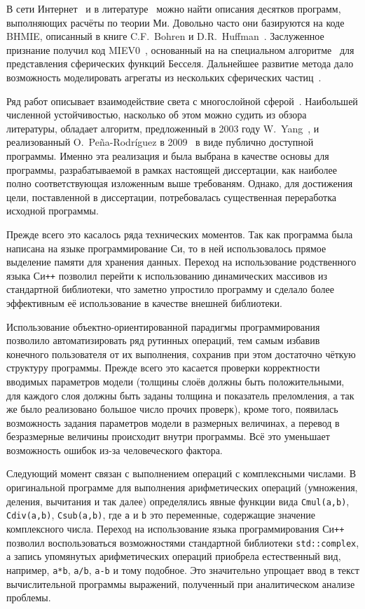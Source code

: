 В сети Интернет~\cite{scattport,wiki-mie-codes} и в
литературе~\cite{Wriedt-2009} можно найти описания десятков программ,
выполняющих расчёты по теории Ми.  Довольно часто они базируются на
коде BHMIE, описанный в книге C.F.~Bohren и
D.R.~Huffman~\cite{Bohren-1983}.  Заслуженное признание получил код
MIEV0~\cite{Wiscombe-1980}, основанный на на специальном
алгоритме~\cite{Lentz-76} для представления сферических функций
Бесселя. Дальнейшее развитие метода дало возможность моделировать
агрегаты из нескольких сферических частиц~\cite{Mackowski-96,Xu-95}.

Ряд работ описывает взаимодействие света с многослойной
сферой~\cite{Kai-94,Wu-97, Bhandari-85}.  Наибольшей численной
устойчивостью, насколько об этом можно судить из обзора литературы,
обладает алгоритм, предложенный в 2003 году W.~Yang~\cite{Yang-2003},
и реализованный O.~Pe\~{n}a-Rodr\'{i}guez в
2009~\cite{Pena-scattnlay-2009} в виде публично доступной программы.
Именно эта реализация и была выбрана в качестве основы для программы,
разрабатываемой в рамках настоящей диссертации, как наиболее полно
соответствующая изложенным выше требованям.  Однако, для достижения
цели, поставленной в диссертации, потребовалась существенная
переработка исходной программы.

Прежде всего это касалось ряда технических моментов. Так как программа
была написана на языке программирование Си, то в ней использовалось
прямое выделение памяти для хранения данных.  Переход на использование
родственного языка Си\texttt{++} позволил перейти к использованию
динамических массивов из стандартной библиотеки, что заметно
упростило программу и сделало более эффективным  её использование в качестве
внешней библиотеки. 

Использование объектно-ориентированной парадигмы программирования
позволило автоматизировать ряд рутинных операций, тем самым избавив
конечного пользователя от их выполнения, сохранив при этом достаточно
чёткую структуру программы.  Прежде всего это касается проверки
корректности вводимых параметров модели (толщины слоёв должны быть
положительными, для каждого слоя должны быть заданы толщина и
показатель преломления, а так же было реализовано большое число прочих
проверк), кроме того, появилась возможность задания параметров модели
в размерных величинах, а перевод в безразмерные величины происходит
внутри программы. Всё это уменьшает возможность ошибок из-за
человеческого фактора.

Следующий момент связан с выполнением операций с комплексными числами.
В оригинальной программе для выполнения арифметических операций
(умножения, деления, вычитания и так далее) определялись явные
функции вида \verb+Cmul(a,b)+, \verb+Cdiv(a,b)+, \verb+Csub(a,b)+, где
\verb+a+ и \verb+b+ это переменные, содержащие значение комплексного
числа.  Переход на использование языка программирования Си\texttt{++}
позволил воспользоваться возможностями стандартной библиотеки
\verb+std::complex+, а запись упомянутых арифметических операций
приобрела естественный вид, например, \verb!a*b!, \verb!a/b!,
\verb!a-b! и тому подобное.  Это значительно упрощает ввод в текст
вычислительной программы выражений, полученный при аналитическом
анализе проблемы.

